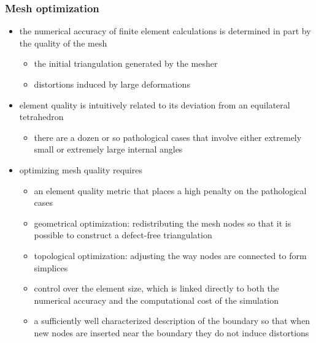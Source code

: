 \begin{frame}[fragile]
%
  \frametitle{Mesh optimization}
%
  \begin{itemize}
%
  \item the numerical accuracy of finite element calculations is determined in part by the
    quality of the mesh
    \begin{itemize}
    \item the initial triangulation generated by the mesher
    \item distortions induced by large deformations
    \end{itemize}
%
  \item element quality is intuitively related to its deviation from an equilateral tetrahedron
    \begin{itemize}
    \item there are a dozen or so pathological cases that involve either extremely small or
      extremely large internal angles
    \end{itemize}
%
  \item optimizing mesh quality requires
    \begin{itemize}
    \item an element quality metric that places a high penalty on the pathological cases
    \item geometrical optimization: redistributing the mesh nodes so that it is possible to
      construct a defect-free triangulation
    \item topological optimization: adjusting the way nodes are connected to form simplices
    \item control over the element size, which is linked directly to both the numerical
      accuracy and the computational cost of the simulation
    \item a sufficiently well characterized description of the boundary so that when new nodes
      are inserted near the boundary they do not induce distortions
    \end{itemize}
%
  \end{itemize}
%
\end{frame}

